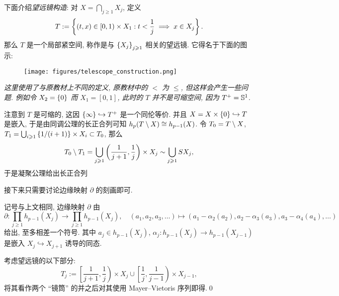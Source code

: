 下面介绍\emph{望远镜构造}: 对 $ X=\bigcap_{j\geqslant 1}X_j $, 定义
\[
	T:=\set{(t,x)\in[0,1)\times X_1 : t<\frac{1}{j}\implies x\in X_j}.
\]
那么 $ T $ 是一个局部紧空间, 称作是与 $ \set{X_j}_{j\geqslant 1} $ 相关的望远镜. 它得名于下面的图示:
\begin{figure}[h]
	\centering
	\texttt{[image: figures/telescope\_construction.png]}
\end{figure}

\textit{这里使用了与原教材上不同的定义, 原教材中的 $ < $ 为 $ \leqslant $, 但这样会产生一些问题. 例如令 $ X_2=\set{0} $ 而 $ X_1=[0,1] $, 此时的 $ T $ 并不是可缩空间, 因为 $ T^+=\S^1 $.}

注意到 $ T $ 是可缩的, 这因 $ \set{\infty}\hookrightarrow T^+ $ 是一个同伦等价. 并且 $ X=X\times\set{0}\hookrightarrow T $ 是嵌入, 于是由同调公理的长正合列可知 $ h_p(T\sm X)\cong h_{p-1}(X) $. 令 $ T_0=T\sm X $, $ T_1=\bigcup_{i\geqslant 1}\set{1/(i+1)}\times X_i\subset T_0 $, 那么
\[
	T_0\sm T_1=\bigcup_{j\geqslant 1}\left(\frac{1}{j+1},\frac{1}{j}\right)\times X_j\sim\bigcup_{j\geqslant 1}SX_j,
\]
于是凝聚公理给出长正合列
\begin{center}
\end{center}
接下来只需要讨论边缘映射 $ \partial $ 的刻画即可.

\begin{Lemma}
	记号与上文相同, 边缘映射 $ \partial $ 由
	\[
		\partial : \prod_{j\geqslant 1}h_{p-1}(X_j)\to\prod_{j\geqslant 1}h_{p-1}(X_j),\quad (a_1,a_2,a_3,\dots)\mapsto(a_1-\alpha_2(a_2),a_2-\alpha_3(a_3),a_3-\alpha_4(a_4),\dots)
	\]
	给出, 至多相差一个符号. 其中 $ a_j\in h_{p-1}(X_j) $, $ \alpha_j : h_{p-1}(X_j)\to h_{p-1}(X_{j-1}) $ 是嵌入 $ X_j\hookrightarrow X_{j+1} $ 诱导的同态.
\end{Lemma}
\begin{Proof}
	考虑望远镜的以下部分:
	\[
		T_j:=\left[\frac{1}{j+1},\frac{1}{j}\right)\times X_j\cup\left[\frac{1}{j},\frac{1}{j-1}\right)\times X_{j-1},
	\]
	将其看作两个 ``镜筒'' 的并之后对其使用 Mayer--Vietoris 序列即得.\qed
\end{Proof}


